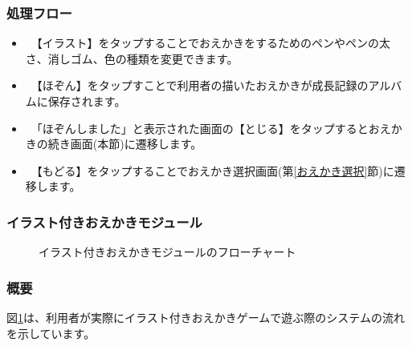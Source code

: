 \documentclass[a4j]{jarticle}
\begin{document}
\subsubsection*{処理フロー}
\begin{itemize}
\item　【イラスト】をタップすることでおえかきをするためのペンやペンの太さ、消しゴム、色の種類を変更できます。
\item　【ほぞん】をタップすことで利用者の描いたおえかきが成長記録のアルバムに保存されます。
\item　「ほぞんしました」と表示された画面の【とじる】をタップするとおえかきの続き画面(本節)に遷移します。　
\item　【もどる】をタップすることでおえかき選択画面(第\ref{おえかき選択}節)に遷移します。
\end{itemize}

\newpage
\subsubsection{イラスト付きおえかきモジュール\label{イラスト}}
\begin{figure}[H]
    \begin{center}
    \caption {イラスト付きおえかきモジュールのフローチャート}
    \label{illustration}
    \end{center}
\end{figure}

\subsubsection*{概要}
図\ref{illustration}は、利用者が実際にイラスト付きおえかきゲームで遊ぶ際のシステムの流れを示しています。
\end{document}
